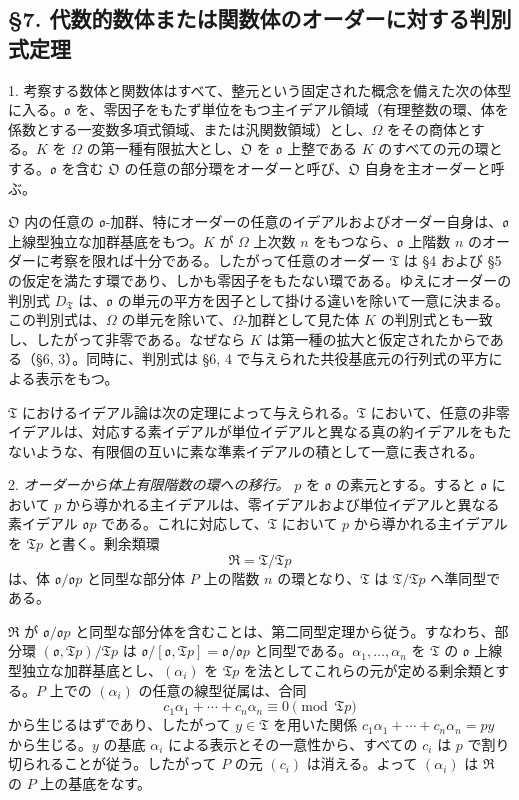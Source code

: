 \documentclass[11pt]{article}
\providecommand{\mR}{\mathfrak{R}}
\providecommand{\mT}{\mathfrak{T}}
\providecommand{\mO}{\mathfrak{O}}
\providecommand{\mo}{\mathfrak{o}}
\begin{document}
\subsection*{\S 7. 代数的数体または関数体のオーダーに対する判別式定理}

1. 考察する数体と関数体はすべて、整元という固定された概念を備えた次の体型に入る。$\mo$ を、零因子をもたず単位をもつ主イデアル領域（有理整数の環、体を係数とする一変数多項式領域、または汎関数領域）とし、$\Omega$ をその商体とする。$K$ を $\Omega$ の第一種有限拡大とし、$\mO$ を $\mo$ 上整である $K$ のすべての元の環とする。$\mo$ を含む $\mO$ の任意の部分環をオーダーと呼び、$\mO$ 自身を主オーダーと呼ぶ。

$\mO$ 内の任意の $\mo$-加群、特にオーダーの任意のイデアルおよびオーダー自身は、$\mo$ 上線型独立な加群基底をもつ。$K$ が $\Omega$ 上次数 $n$ をもつなら、$\mo$ 上階数 $n$ のオーダーに考察を限れば十分である。したがって任意のオーダー $\mT$ は \S 4 および \S 5 の仮定を満たす環であり、しかも零因子をもたない環である。ゆえにオーダーの判別式 $D_\mT$ は、$\mo$ の単元の平方を因子として掛ける違いを除いて一意に決まる。この判別式は、$\Omega$ の単元を除いて、$\Omega$-加群として見た体 $K$ の判別式とも一致し、したがって非零である。なぜなら $K$ は第一種の拡大と仮定されたからである（\S 6, 3）。同時に、判別式は \S 6, 4 で与えられた共役基底元の行列式の平方による表示をもつ。

$\mT$ におけるイデアル論は次の定理によって与えられる。$\mT$ において、任意の非零イデアルは、対応する素イデアルが単位イデアルと異なる真の約イデアルをもたないような、有限個の互いに素な準素イデアルの積として一意に表される。

2. \emph{オーダーから体上有限階数の環への移行。} $p$ を $\mo$ の素元とする。すると $\mo$ において $p$ から導かれる主イデアルは、零イデアルおよび単位イデアルと異なる素イデアル $\mo p$ である。これに対応して、$\mT$ において $p$ から導かれる主イデアルを $\mT p$ と書く。剰余類環
\[
        \mR=\mT/\mT p
\]
は、体 $\mo/\mo p$ と同型な部分体 $P$ 上の階数 $n$ の環となり、$\mT$ は $\mT/\mT p$ へ準同型である。

$\mR$ が $\mo/\mo p$ と同型な部分体を含むことは、第二同型定理から従う。すなわち、部分環 $(\mo,\mT p)/\mT p$ は $\mo/[\mo,\mT p]=\mo/\mo p$ と同型である。$\alpha_1,\ldots,\alpha_n$ を $\mT$ の $\mo$ 上線型独立な加群基底とし、$(\alpha_i)$ を $\mT p$ を法としてこれらの元が定める剰余類とする。$P$ 上での $(\alpha_i)$ の任意の線型従属は、合同
\[
        c_1\alpha_1+\cdots+c_n\alpha_n\equiv0\pmod{\mT p}
\]
から生じるはずであり、したがって $y\in\mT$ を用いた関係 $c_1\alpha_1+\cdots+c_n\alpha_n=py$ から生じる。$y$ の基底 $\alpha_i$ による表示とその一意性から、すべての $c_i$ は $p$ で割り切られることが従う。したがって $P$ の元 $(c_i)$ は消える。よって $(\alpha_i)$ は $\mR$ の $P$ 上の基底をなす。
\end{document}
